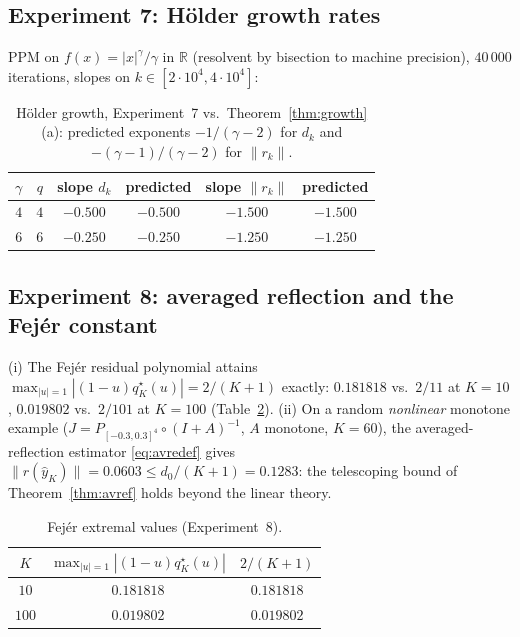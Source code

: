\documentclass[11pt]{article}
\theoremstyle{definition}
\theoremstyle{remark}
\newcommand{\R}{\mathbb{R}}
\newcommand{\norm}[1]{\| #1 \|}
\newcommand{\abs}[1]{| #1 |}
\begin{document}
\subsection{Experiment 7: H\"older growth rates}\label{sec:exp5}

PPM on $f(x)=\abs{x}^\gamma/\gamma$ in $\R$ (resolvent by bisection to
machine precision), $40\,000$ iterations, slopes on
$k\in[2\cdot10^4,4\cdot10^4]$:

\begin{table}[htbp]
\centering\small
\caption{H\"older growth, Experiment~7 vs.\ Theorem~\ref{thm:growth}(a):
predicted exponents $-1/(\gamma-2)$ for $d_k$ and $-(\gamma-1)/(\gamma-2)$
for $\norm{r_k}$.}
\label{tab:growth}
\begin{tabular}{cccccc}
\toprule
$\gamma$ & $q$ & slope $d_k$ & predicted & slope $\norm{r_k}$ & predicted\\
\midrule
$4$ & $4$ & $-0.500$ & $-0.500$ & $-1.500$ & $-1.500$\\
$6$ & $6$ & $-0.250$ & $-0.250$ & $-1.250$ & $-1.250$\\
\bottomrule
\end{tabular}
\end{table}

\subsection{Experiment 8: averaged reflection and the Fej\'er
constant}\label{sec:exp6}

(i) The Fej\'er residual polynomial attains
$\max_{\abs{u}=1}\abs{(1-u)q_K^\star(u)}=2/(K+1)$ exactly:
$0.181818$ vs.\ $2/11$ at $K=10$, $0.019802$ vs.\ $2/101$ at $K=100$
(Table~\ref{tab:fejer}). (ii) On a random \emph{nonlinear} monotone
example ($J=P_{[-0.3,0.3]^4}\circ(I+A)^{-1}$, $A$ monotone, $K=60$), the
averaged-reflection estimator \eqref{eq:avredef} gives
$\norm{r(\hat y_K)}=0.0603\le d_0/(K+1)=0.1283$: the telescoping bound of
Theorem~\ref{thm:avref} holds beyond the linear theory.

\begin{table}[htbp]
\centering\small
\caption{Fej\'er extremal values (Experiment~8).}
\label{tab:fejer}
\begin{tabular}{ccc}
\toprule
$K$ & $\max_{\abs{u}=1}\abs{(1-u)q_K^\star(u)}$ & $2/(K+1)$\\
\midrule
$10$ & $0.181818$ & $0.181818$\\
$100$ & $0.019802$ & $0.019802$\\
\bottomrule
\end{tabular}
\end{table}
\end{document}
